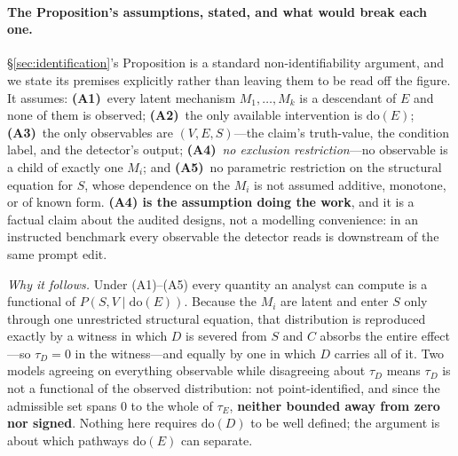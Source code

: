 \paragraph{The Proposition's assumptions, stated, and what would break each one.} §\ref{sec:identification}'s Proposition is a standard non-identifiability argument, and we state its premises explicitly rather than leaving them to be read off the figure. It assumes: \textbf{(A1)}~every latent mechanism $M_1,\dots,M_k$ is a descendant of $E$ and none of them is observed; \textbf{(A2)}~the only available intervention is $\mathrm{do}(E)$; \textbf{(A3)}~the only observables are $(V,E,S)$---the claim's truth-value, the condition label, and the detector's output; \textbf{(A4)}~\emph{no exclusion restriction}---no observable is a child of exactly one $M_i$; and \textbf{(A5)}~no parametric restriction on the structural equation for $S$, whose dependence on the $M_i$ is not assumed additive, monotone, or of known form. \textbf{(A4) is the assumption doing the work}, and it is a factual claim about the audited designs, not a modelling convenience: in an instructed benchmark every observable the detector reads is downstream of the same prompt edit.

\emph{Why it follows.} Under (A1)--(A5) every quantity an analyst can compute is a functional of $P(S,V \mid \mathrm{do}(E))$. Because the $M_i$ are latent and enter $S$ only through one unrestricted structural equation, that distribution is reproduced exactly by a witness in which $D$ is severed from $S$ and $C$ absorbs the entire effect---so $\tau_D\!=\!0$ in the witness---and equally by one in which $D$ carries all of it. Two models agreeing on everything observable while disagreeing about $\tau_D$ means $\tau_D$ is not a functional of the observed distribution: not point-identified, and since the admissible set spans $0$ to the whole of $\tau_E$, \textbf{neither bounded away from zero nor signed}. Nothing here requires $\mathrm{do}(D)$ to be well defined; the argument is about which pathways $\mathrm{do}(E)$ can separate.

